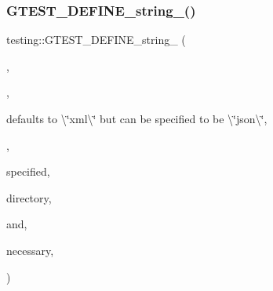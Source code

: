 \mbox{\label{namespacetesting_a540064257c7d8030f84b886bc519aaf8}} 
\subsubsection{\texorpdfstring{GTEST\_DEFINE\_string\_()}{GTEST\_DEFINE\_string\_()}\hspace{0.1cm}{\footnotesize\ttfamily [4/5]}}
{\footnotesize\ttfamily testing\+::\+G\+T\+E\+S\+T\+\_\+\+D\+E\+F\+I\+N\+E\+\_\+string\+\_\+ (\begin{DoxyParamCaption}\item[{output}]{,  }\item[{\mbox{\hyperlink{namespacetesting_1_1internal_a7ed785df46a339403b0f749d3a879201}{internal\+::\+String\+From\+G\+Test\+Env}}(\char`\"{}output\char`\"{}, internal\+::\+Output\+Flag\+Also\+Check\+Env\+Var().c\+\_\+str())}]{,  }\item[{\char`\"{}A format }]{defaults to \textbackslash{}\char`\"{}xml\textbackslash{}\char`\"{} but can be specified to be \textbackslash{}\char`\"{}json\textbackslash{}\char`\"{},  }\item[{\char`\"{} \char`\"{}optionally followed by a colon and an output file name or directory. \char`\"{} \char`\"{}A directory is indicated by a trailing pathname separator. \char`\"{} \char`\"{}Examples\+:\textbackslash{}\char`\"{}xml\+:filename.\+xml\textbackslash{}\char`\"{}}]{,  }\item[{\textbackslash{}\char`\"{}xml\+::directoryname/\textbackslash{}\char`\"{}. \char`\"{} \char`\"{}If a directory is}]{specified,  }\item[{output files will be created \char`\"{} \char`\"{}within that}]{directory,  }\item[{with file-\/\mbox{\hyperlink{_mutual_8h_a78a6dba1026eca68e2950c3857634cb3}{names}} based on the \mbox{\hyperlink{_mutual_8h_a707ee03719e99670bf6cfdfd897b8456}{test}} \char`\"{} \char`\"{}executable \textquotesingle{}s name}]{and,  }\item[{if}]{necessary,  }\item[{made unique by adding \char`\"{} \char`\"{}digits.\char`\"{}}]{ }\end{DoxyParamCaption})}

\mbox{\label{namespacetesting_a5cfe9778e1cc8b5cf04bfe9e764ddff6}} 
